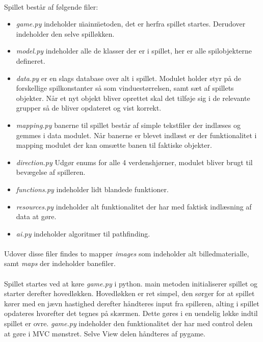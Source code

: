 \documentclass[10pt,a4paper,danish]{article}
\begin{document}
\paragraph{}
Spillet består af følgende filer:
\begin{itemize}
\item \textit{game.py} indeholder \"main\" metoden, det er herfra spillet startes. Derudover indeholder den selve spilløkken.
\item \textit{model.py} indeholder alle de klasser der er i spillet, her er alle spilobjekterne defineret.
\item \textit{data.py} er en slags database over alt i spillet. Modulet holder styr på de forskellige spilkonstanter så som vinduestørrelsen, samt sæt af spillets objekter. Når et nyt objekt bliver oprettet skal det tilføje sig i de relevante grupper så de bliver opdateret og vist korrekt.
\item \textit{mapping.py} banerne til spillet består af simple tekstfiler der indlæses og gemmes i data modulet. Når banerne er blevet indlæst er der funktionalitet i mapping modulet der kan omsætte banen til faktiske objekter.
\item \textit{direction.py} Udgør enums for alle 4 verdenshjørner, modulet bliver brugt til bevægelse af spilleren.
\item \textit{functions.py} indeholder lidt blandede funktioner.
\item \textit{resources.py} indeholder alt funktionalitet der har med faktisk indlæsning af data at gøre.
\item \textit{ai.py} indeholder algoritmer til pathfinding.
\end{itemize}

\paragraph{}
Udover disse filer findes to mapper \textit{images} som indeholder alt billedmaterialle, samt \textit{maps} der indeholder banefiler.

\paragraph{}
Spillet startes ved at køre \textit{game.py} i python. main metoden initialiserer spillet og starter derefter hovedløkken. Hovedløkken er ret simpel, den sørger for at spillet kører med en jævn hastighed derefter håndteres input fra spilleren, alting i spillet opdateres hvorefter det tegnes på skærmen. Dette gøres i en uendelig løkke indtil spillet er ovre. \textit{game.py} indeholder den funktionalitet der har med control delen at gøre i MVC mønstret. Selve View delen håndteres af pygame.
\end{document}

